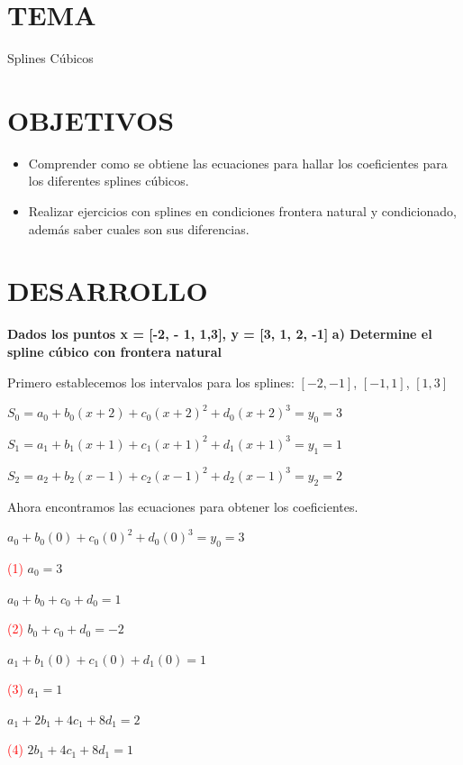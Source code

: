 \documentclass[12pt]{article}
\begin{document}
\section*{TEMA}
Splines Cúbicos

\vspace{0.5cm}

\section*{OBJETIVOS}
\begin{itemize}
    \item Comprender como se obtiene las ecuaciones para hallar los coeficientes para los diferentes splines cúbicos.
    \item Realizar ejercicios con splines en condiciones frontera natural y condicionado, además saber cuales son sus diferencias.

\end{itemize}

\vspace{0.5cm}


\section*{DESARROLLO}

\textbf{Dados los puntos x = [-2, - 1, 1,3], y = [3, 1, 2, -1]}
\textbf{a) Determine el spline cúbico con frontera natural}



Primero establecemos los intervalos para los splines: $[-2,-1]$, $[-1,1]$, $[1,3]$

$S_0 = a_0+b_0(x+2)+c_0(x+2)^2+d_0(x+2)^3 = y_0 = 3$

$S_1 = a_1+b_1(x+1)+c_1(x+1)^2+d_1(x+1)^3 = y_1 = 1$

$S_2 = a_2+b_2(x-1)+c_2(x-1)^2+d_2(x-1)^3 = y_2 = 2$


Ahora encontramos las ecuaciones para obtener los coeficientes.

$a_0+b_0(0)+c_0(0)^2+d_0(0)^3 = y_0 = 3$

\textcolor{red}{(1)} $a_0 = 3$

$a_0+b_0+c_0+d_0 = 1$

\textcolor{red}{(2)} $b_0+c_0+d_0 = -2$

$a_1+b_1(0)+c_1(0)+d_1(0) = 1$

\textcolor{red}{(3)} $a_1 = 1$

$a_1+2b_1+4c_1+8d_1 = 2$

\textcolor{red}{(4)} $2b_1+4c_1+8d_1 = 1$
\end{document}
